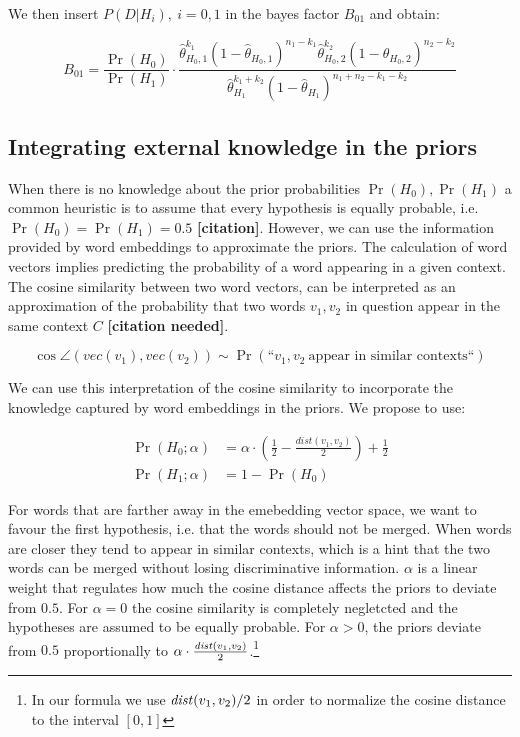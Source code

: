 We then insert $P(D|H_i),~i=0,1$ in the bayes factor $B_{01}$ and obtain:

\begin{equation*}
B_{01} = \frac{\Pr(H_0)}{\Pr(H_1)} \cdot
\frac{\hat{\theta}_{H_0,1}^{k_1}\left(1-\hat{\theta}_{H_0,1}\right)^{n_1-k_1}\hat{\theta}_{H_0,2}^{k_2}\left(1-\hat{\theta}_{H_0,2}\right)^{n_2-k_2}
}{\hat{\theta}_{H_1}^{k_1 + k_2}\left(1-\hat{\theta}_{H_1}\right)^{n_1 +
n_2 - k_1 - k_2}}
\end{equation*}

\subsection{Integrating external knowledge in the priors}
When there is no knowledge about the prior probabilities $\Pr(H_0), \Pr(H_1)$ a
common heuristic is to assume that every hypothesis is equally probable, i.e.
$\Pr(H_0) = \Pr(H_1) = 0.5$ \textbf{[citation]}. However, we can use the information
provided by word embeddings to approximate the priors. The calculation of word
vectors implies predicting the probability of a word appearing in a given
context. The cosine similarity between two word vectors, can be interpreted as
an approximation of the probability that two words $v_1, v_2$ in question appear
in the same context $C$ \textbf{[citation needed]}. 

\begin{equation*}
	\cos \angle (vec(v_1), vec(v_2)) \sim \Pr(\text{``}v_1, v_2~\text{appear in
	similar contexts} \text{``})
\end{equation*}

We can use this interpretation of the cosine similarity to incorporate the
knowledge captured by word embeddings in the priors. We propose to use: 

\begin{equation*}
\begin{split}
	\Pr(H_0; \alpha) &= \alpha\cdot\left(\frac 1 2 - \frac{dist(v_1,v_2)}{2}\right)
	+ \frac 1 2
	\\
	\Pr(H_1; \alpha) &= 1 - \Pr(H_0)
\end{split}
\end{equation*}

For words that are farther away in the emebedding vector space, we want to
favour the first hypothesis, i.e. that the words should not be merged. When
words are closer they tend to appear in similar contexts, which is a hint that
the two words can be merged without losing discriminative information. $\alpha$
is a linear weight that regulates how much the cosine distance affects the
priors to deviate from $0.5$. For $\alpha=0$ the cosine similarity is completely
negletcted and the hypotheses are assumed to be equally probable. For $\alpha >
0$, the priors deviate from $0.5$ proportionally to $\alpha \cdot
\frac{\mathit{dist}(v_1,v_2)}{2}$.\footnote{In our formula we use
$\mathit{dist}(v_1,v_2)/2$ in order to normalize the cosine distance to the interval $[0, 1]$}

